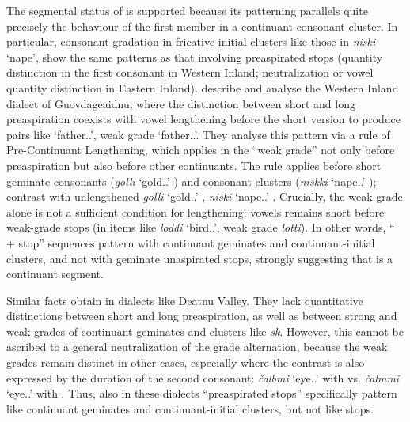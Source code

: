 \documentclass[output=paper,colorlinks,citecolor=brown]{langscibook}
\begin{document}
\largerpage
\begin{sloppypar}
The segmental status of \ipa{[h]} is supported because its patterning parallels quite precisely the behaviour of the first member in a continuant\hyp consonant cluster. In particular, consonant gradation in fricative\hyp initial clusters like those in \textit{niski} `nape', show the same patterns as that involving preaspirated stops (quantity distinction in the first consonant in Western Inland; neutralization or vowel quantity distinction in Eastern Inland). \Textcite{bals2006north, bals2012north} describe and analyse the Western Inland dialect of Guovdageaidnu, where the distinction between short and long preaspiration coexists with vowel lengthening before the short version to produce pairs like \ipa{[ahːt͡ʃi]} `father.\Nom.\Sg', weak grade \ipa{[aːht͡ʃi]} `father.\Gen.\Sg'. They analyse this pattern via a rule of Pre-Continuant Lengthening, which applies in the \enquote{weak grade} not only before preaspiration but also before other continuants. The rule applies before short geminate consonants (\textit{golli} `gold.\Gen.\Sg' \ipa{[koːlːi]}) and consonant clusters (\textit{niskki} `nape.\Gen.\Sg' \ipa{[niːski]}); contrast with unlengthened \textit{gol\textquotesingle li} `gold.\Nom.\Sg' \ipa{[kolːli]}, \textit{niski} `nape.\Nom.\Sg' \ipa{[nisːki]}.  Crucially, the weak grade alone is not a sufficient condition for lengthening: vowels remains short before weak\hyp grade stops (in items like \textit{loddi} `bird.\Nom.\Sg', weak grade \textit{lotti}). In other words, \enquote{\ipa{[h]} + stop} sequences pattern with continuant geminates and continuant\hyp initial clusters, and not with geminate unaspirated stops, strongly suggesting that \ipa{[h]} is a continuant segment.

Similar facts obtain in dialects like Deatnu Valley. They lack quantitative distinctions between short and long preaspiration, as well as between strong and weak grades of continuant geminates and clusters like \textit{sk}. However, this cannot be ascribed to a general neutralization of the grade alternation, because the weak grades remain distinct in other cases, especially where the contrast is also expressed by the duration of the second consonant: \textit{čalbmi} `eye.\Nom.\Sg' with \ipa{[lm]} vs. \textit{čalmmi} `eye.\Gen.\Sg' with \ipa{[lmː]} \parencite[141]{sammallahti2019láidehus}. Thus, also in these dialects \enquote{preaspirated stops} specifically pattern like continuant geminates and continuant\hyp initial clusters, but not like stops.
\end{sloppypar}
\end{document}
